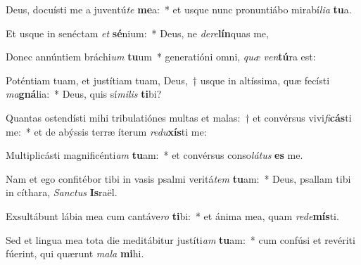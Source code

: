 \item Deus, docuísti me a juventú\textit{te} \textbf{me}a:~* et usque nunc pronuntiábo mirabí\textit{li}\textit{a} \textbf{tu}a.
\item Et usque in senéctam \textit{et} \textbf{sé}nium:~* Deus, ne \textit{de}\textit{re}\textbf{lín}quas me,
\item Donec annúntiem bráchi\textit{um} \textbf{tu}um~* generatióni omni, \textit{quæ} \textit{ven}\textbf{tú}ra est:
\item Poténtiam tuam, et justítiam tuam, Deus,~† usque in altíssima, quæ fecísti \textit{ma}\textbf{gná}lia:~* Deus, quis sí\textit{mi}\textit{lis} \textbf{ti}bi?
\item Quantas ostendísti mihi tribulatiónes multas et malas:~† et convérsus vivi\textit{fi}\textbf{cás}ti me:~* et de abýssis terræ íterum \textit{re}\textit{du}\textbf{xís}ti me:
\item Multiplicásti magnificénti\textit{am} \textbf{tu}am:~* et convérsus conso\textit{lá}\textit{tus} \textbf{es} me.
\item Nam et ego confitébor tibi in vasis psalmi veritá\textit{tem} \textbf{tu}am:~* Deus, psallam tibi in cíthara, \textit{Sanc}\textit{tus} \textbf{Is}raël.
\item Exsultábunt lábia mea cum cantáve\textit{ro} \textbf{ti}bi:~* et ánima mea, quam \textit{red}\textit{e}\textbf{mís}ti.
\item Sed et lingua mea tota die meditábitur justíti\textit{am} \textbf{tu}am:~* cum confúsi et revériti fúerint, qui quærunt \textit{ma}\textit{la} \textbf{mi}hi.

